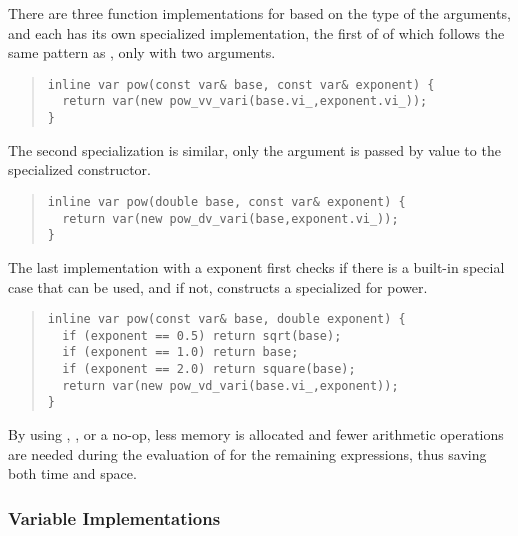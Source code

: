 \documentclass[10pt]{article}
\begin{document}
There are three function implementations for  based on the
type of the arguments, and each has its own specialized
implementation, the first of of which follows the same pattern as
, only with two arguments.
%
\begin{quote}
\begin{Verbatim}
inline var pow(const var& base, const var& exponent) {
  return var(new pow_vv_vari(base.vi_,exponent.vi_));
}
\end{Verbatim}
\end{quote}
%
The second specialization is similar, only the  argument
is passed by value to the specialized  constructor.
%
\begin{quote}
\begin{Verbatim}
inline var pow(double base, const var& exponent) {
  return var(new pow_dv_vari(base,exponent.vi_));
}
\end{Verbatim}
\end{quote}
%
The last implementation with a  exponent first checks if
there is a built-in special case that can be used, and if not,
constructs a specialized  for power.
%
\begin{quote}
\begin{Verbatim}
inline var pow(const var& base, double exponent) {
  if (exponent == 0.5) return sqrt(base);
  if (exponent == 1.0) return base;
  if (exponent == 2.0) return square(base);
  return var(new pow_vd_vari(base.vi_,exponent));
}
\end{Verbatim}
\end{quote}
%
By using , , or a no-op, less memory is
allocated and fewer arithmetic operations are needed during the
evaluation of  for the remaining expressions, thus
saving both time and space.

\subsubsection{Variable Implementations}
\end{document}
